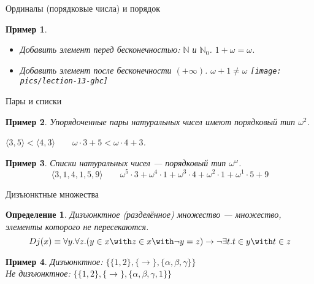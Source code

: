 \documentclass[aspectratio=169]{beamer}
\newtheorem{dfn}{Определение}[section]
\newtheorem{exm}{Пример}[section]
\begin{document}
\begin{frame}{Ординалы (порядковые числа) и порядок}
\begin{exm}\begin{itemize}
\item Добавить элемент перед бесконечностью: $\mathbb{N}$ и $\mathbb{N}_0$.
\pause
$1 + \omega = \omega$. \pause
\item Добавить элемент после бесконечности $(+\infty)$. \pause $\omega + 1 \ne \omega$ \pause
\texttt{[image: pics/lection-13-ghc]}
\end{itemize}\end{exm} 
\end{frame}

\begin{frame}{Пары и списки}
\begin{exm}Упорядоченные пары натуральных чисел имеют порядковый тип $\omega^2$.\pause

\begin{center}$\langle 3,5 \rangle < \langle 4,3 \rangle\quad\quad\omega \cdot 3 + 5 < \omega \cdot 4 + 3$.\end{center}\end{exm}\pause

\begin{exm}Списки натуральных чисел --- порядковый тип $\omega^\omega$.
$$\langle 3,1,4,1,5,9\rangle\quad\quad \omega^5 \cdot 3 + \omega^4 \cdot 1 + \omega^3 \cdot 4 + \omega^2 \cdot 1 + \omega^1 \cdot 5 + 9$$\end{exm}
\end{frame}

\begin{frame}{Дизъюнктные множества}
\begin{dfn}Дизъюнктное (разделённое) множество --- множество, элементы которого
не пересекаются. 
$$Dj(x) \equiv \forall y.\forall z.(y \in x \with z \in x \with \neg y=z) \rightarrow 
\neg \exists t.t \in y \with t \in z$$
\end{dfn}\pause

\begin{exm}Дизъюнктное: $\{\{1,2\},\{\rightarrow\},\{\alpha,\beta,\gamma\}\}$\\ \pause
Не дизъюнктное: $\{\{1,2\},\{\rightarrow\},\{\alpha,\beta,\gamma,1\}\}$
\end{exm}
\end{frame}
\end{document}
